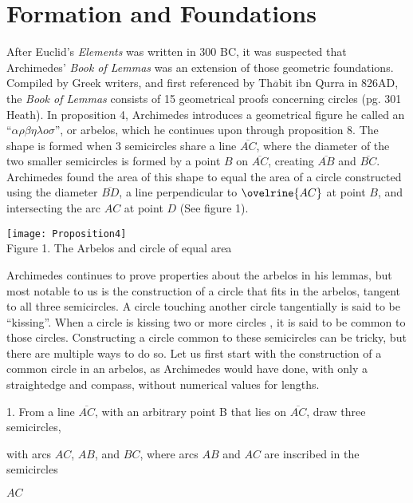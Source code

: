 \documentclass[12pt]{article}
\begin{document}
\section{Formation and Foundations}
\hspace{\parindent} After Euclid's \textit{Elements} was written in 300 BC, it was suspected that Archimedes’ \textit{Book of Lemmas} was an extension of those geometric foundations. Compiled by Greek writers, and first referenced by Th$\overline{a}$bit ibn Qurra in 826AD, the \textit{Book of Lemmas} consists of 15 geometrical proofs concerning circles (pg. 301 Heath). In proposition 4, Archimedes introduces a geometrical figure he called an  “$\alpha \rho \beta \eta \lambda o \sigma$”, or arbelos, which he continues upon through proposition 8. The shape is formed when 3 semicircles share a line $\overline{AC}$, where the diameter of the two smaller semicircles is formed by a point $B$ on $\overline{AC}$, creating $\overline{AB}$ and $\overline{BC}$. Archimedes found the area of this shape to equal the area of a circle constructed using the diameter $\overline{BD}$, a line perpendicular to $\ovelrine{AC}$ at point $B$, and intersecting the arc $AC$ at point $D$ (See figure 1). 
\begin{center}
\texttt{[image: Proposition4]}\\
Figure 1.   The Arbelos and circle of equal area
\end{center}

Archimedes continues to prove properties about the arbelos in his lemmas, but most notable to us  is the construction of a circle that fits in the arbelos, tangent to all three semicircles. A circle touching another circle tangentially is said to be “kissing”.  When a circle is kissing two or more circles , it is said to be common to those circles. Constructing a circle common to these semicircles can be tricky, but there are multiple ways to do so. Let us first start with the construction of a common circle in an arbelos, as Archimedes would have done, with only a straightedge and compass, without numerical values for lengths.

1. From a line $\overline{AC}$, with an arbitrary point B that lies on $\overline{AC}$, draw three semicircles, 

\hspace{15}with arcs $AC$, $AB$, and $BC$, where arcs $AB$ and $AC$ are inscribed in the semicircles 

\hspace{15}$AC$
\end{document}
